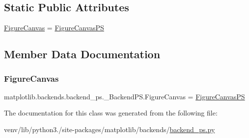 \subsection*{Static Public Attributes}
\begin{DoxyCompactItemize}
\item 
\hyperlink{classmatplotlib_1_1backends_1_1backend__ps_1_1__BackendPS_a33e2bf4c67b726365d7b8b7a7bc00bb8}{Figure\+Canvas} = \hyperlink{classmatplotlib_1_1backends_1_1backend__ps_1_1FigureCanvasPS}{Figure\+Canvas\+PS}
\end{DoxyCompactItemize}


\subsection{Member Data Documentation}
\mbox{\label{classmatplotlib_1_1backends_1_1backend__ps_1_1__BackendPS_a33e2bf4c67b726365d7b8b7a7bc00bb8}} 
\subsubsection{\texorpdfstring{Figure\+Canvas}{FigureCanvas}}
{\footnotesize\ttfamily matplotlib.\+backends.\+backend\+\_\+ps.\+\_\+\+Backend\+P\+S.\+Figure\+Canvas = \hyperlink{classmatplotlib_1_1backends_1_1backend__ps_1_1FigureCanvasPS}{Figure\+Canvas\+PS}\hspace{0.3cm}{\ttfamily [static]}}



The documentation for this class was generated from the following file\+:\begin{DoxyCompactItemize}
\item 
venv/lib/python3./site-\/packages/matplotlib/backends/\hyperlink{backend__ps_8py}{backend\+\_\+ps.\+py}\end{DoxyCompactItemize}
